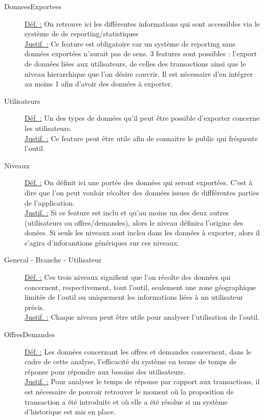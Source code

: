 \begin{description}
\item [DonneesExportees]
\underline{Déf. :}  On retrouve ici les différentes informations qui sont accessibles via le système de de reporting/statistiques
\\ \underline{Justif. :}  Ce feature est obligatoire car un système de reporting sans données exportées n'aurait pas de sens.  3 features sont possibles : l'export de données liées aux utilisateurs,  de celles des transactions ainsi que le niveau hierarchique que l'on désire couvrir.  Il est nécessaire d'en intégrer au moins 1 afin d'avoir des données à exporter.  

\item [Utilisateurs]
\underline{Déf. :}  Un des types de données qu'il peut être possible d'exporter concerne les utilisateurs.
\\ \underline{Justif. :}  Ce feature peut être utile afin de connaitre le public qui fréquente l'outil.
\newline

\item [Niveaux]
\underline{Déf. :}  On définit ici une portée des données qui seront exportées.  C'est à dire que l'on peut vouloir récolter des données issues de diffférentes parties de l'application.
\\ \underline{Justif. :}  Si ce feature est inclu et qu'au moins un des deux autres (utilisateurs ou offres/demandes),  alors le niveau définira l'origine des donées.  Si seuls les niveaux sont inclsu dans les données à exporter,  alors il s'agira d'inforamtions génériques sur ces niveaux.  
\newline

\item [General - Branche - Utilisateur]
\underline{Déf. :}  Ces trois niveaux signifient que l'on récolte des données qui concernent,  respectivement,  tout l'outil,  seulement une zone géographique limitée de l'outil ou uniquement les informations liées à un utilisateur précis.
\\ \underline{Justif. :}  Chaque niveau peut être utile pour analyser l'utilisation de l'outil.
\newline

\item [OffresDemandes]
\underline{Déf. :}  Les données concernant les offres et demandes concernent,  dans le cadre de cette analyse,  l'efficacité du système en terme de temps de réponse pour répondre aux besoins des utilisateurs.  
\\ \underline{Justif. :}  Pour analyser le temps de réponse par rapport aux transactions,  il est nécessaire de pouvoir retrouver le moment où la proposition de transaction a été introduite et où elle a été résolue si un système d'historique est mis en place.  
\newline


\end{description}
